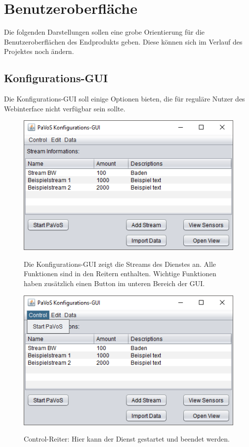 \chapter{Benutzeroberfläche}
Die folgenden Darstellungen sollen eine grobe Orientierung für die Benutzeroberflächen des Endprodukts geben. Diese können sich im Verlauf des Projektes noch ändern.
\section{Konfigurations-GUI}
Die Konfigurations-GUI soll einige Optionen bieten, die für reguläre Nutzer des Webinterface nicht verfügbar sein sollte.

\begin{figure}[H]
	\centering
		\includegraphics[width=0.6\linewidth]{gui/backend/BackendGUIMain.png}\\
	\caption{Die Konfigurations-GUI zeigt die Streams des Dienstes an. Alle Funktionen sind in den Reitern enthalten. Wichtige Funktionen haben zusätzlich einen Button im unteren Bereich der GUI.}
\end{figure}

\begin{figure}[H]
	\centering
		\includegraphics[width=0.6\linewidth]{gui/backend/BackendGUIMenu1.png}\\
	\caption{Control-Reiter: Hier kann der Dienst gestartet und beendet werden.}
\end{figure}

